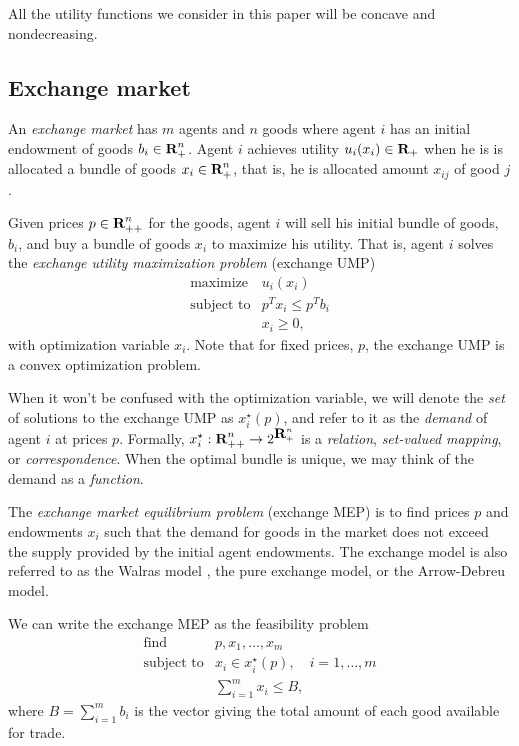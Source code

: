 \documentclass[12pt]{article}
\begin{document}
All the utility functions we consider in this paper will
be concave and nondecreasing.

\subsection{Exchange market}
\label{sec:exchange_def}
An \emph{exchange market} has $m$ agents and $n$ goods where
agent $i$ has an initial endowment of goods $b_i \in {\mbox{\bf R}}_+^n$.
Agent $i$ achieves utility $u_i(x_i) \in {\mbox{\bf R}}_+$ when he is is allocated a
bundle of goods $x_i \in {\mbox{\bf R}}^n_{+}$,
that is, he is allocated amount $x_{ij}$ of good $j$.

Given prices $p \in {\mbox{\bf R}}^n_{++}$ for the goods, agent $i$ will sell his
initial bundle of goods, $b_i$, and buy a bundle of goods
$x_i$ to maximize his utility.
That is, agent $i$ solves the \emph{exchange utility maximization problem} (exchange UMP)
\begin{equation}
\label{p-ump}
\begin{array}{ll}
\mbox{maximize} & u_i(x_i) \\
\mbox{subject to} & p^T x_i \leq p^T b_i \\
& x_i \geq 0,
\end{array}
\end{equation}
with optimization variable $x_i$. Note that for fixed prices, $p$, the exchange UMP is a convex optimization problem.

When it won't be confused with the optimization variable,
we will denote the \emph{set} of solutions to the exchange UMP as $x^\star_i(p)$,
and refer to it as the \emph{demand} of agent $i$ at prices $p$.
Formally, $x_i^\star : {\mbox{\bf R}}^n_{++} \to 2^{{\mbox{\bf R}}^n_+}$ is a
\emph{relation}, \emph{set-valued mapping}, or \emph{correspondence}.
When the optimal bundle is unique, we may think of
the demand as a \emph{function}.

The \emph{exchange market equilibrium problem} (exchange MEP) is to find prices $p$ and endowments $x_i$
such that the demand for goods in the market does not exceed the supply
provided by the initial agent endowments.
The exchange model is also referred to as the Walras model \cite{walras1896elements},
the pure exchange model, or the Arrow-Debreu model.

We can write the exchange MEP as the feasibility problem
\begin{equation}
\label{p-mep}
\begin{array}{ll}
\mbox{find} & p, x_1, \ldots, x_m \\
\mbox{subject to} & x_i \in x_i^\star(p),\quad i = 1,\ldots, m \\
& \sum_{i=1}^m x_i \leq B,
\end{array}
\end{equation}
where $B = \sum_{i=1}^m b_i$ is the vector giving the total amount of each good
available for trade.
\end{document}
